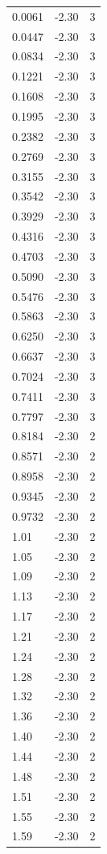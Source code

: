 \begin{longtable}{lrr}
  0.0061 & -2.30 & 3 \\
  0.0447 & -2.30 & 3 \\
  0.0834 & -2.30 & 3 \\
  0.1221 & -2.30 & 3 \\
  0.1608 & -2.30 & 3 \\
  0.1995 & -2.30 & 3 \\
  0.2382 & -2.30 & 3 \\
  0.2769 & -2.30 & 3 \\
  0.3155 & -2.30 & 3 \\
  0.3542 & -2.30 & 3 \\
  0.3929 & -2.30 & 3 \\
  0.4316 & -2.30 & 3 \\
  0.4703 & -2.30 & 3 \\
  0.5090 & -2.30 & 3 \\
  0.5476 & -2.30 & 3 \\
  0.5863 & -2.30 & 3 \\
  0.6250 & -2.30 & 3 \\
  0.6637 & -2.30 & 3 \\
  0.7024 & -2.30 & 3 \\
  0.7411 & -2.30 & 3 \\
  0.7797 & -2.30 & 3 \\
  0.8184 & -2.30 & 2 \\
  0.8571 & -2.30 & 2 \\
  0.8958 & -2.30 & 2 \\
  0.9345 & -2.30 & 2 \\
  0.9732 & -2.30 & 2 \\
  1.01 & -2.30 & 2 \\
  1.05 & -2.30 & 2 \\
  1.09 & -2.30 & 2 \\
  1.13 & -2.30 & 2 \\
  1.17 & -2.30 & 2 \\
  1.21 & -2.30 & 2 \\
  1.24 & -2.30 & 2 \\
  1.28 & -2.30 & 2 \\
  1.32 & -2.30 & 2 \\
  1.36 & -2.30 & 2 \\
  1.40 & -2.30 & 2 \\
  1.44 & -2.30 & 2 \\
  1.48 & -2.30 & 2 \\
  1.51 & -2.30 & 2 \\
  1.55 & -2.30 & 2 \\
  1.59 & -2.30 & 2 \\

\end{longtable}
